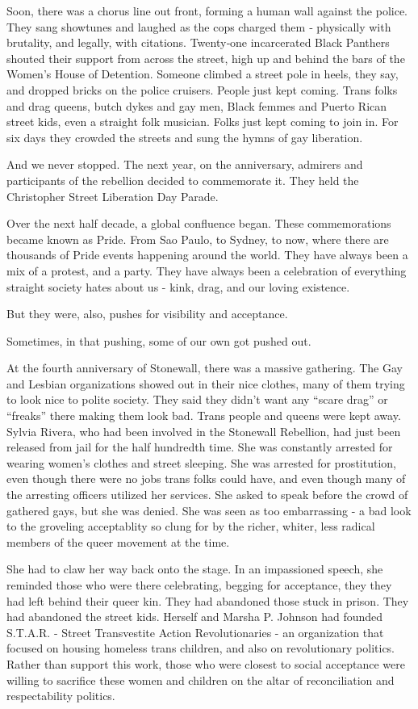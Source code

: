\documentclass[
]{book}
\begin{document}
Soon, there was a chorus line out front, forming a human wall against the police. They sang showtunes and laughed as the cops charged them ‑ physically with brutality, and legally, with citations. Twenty‑one incarcerated Black Panthers shouted their support from across the street, high up and behind the bars of the Women's House of Detention. Someone climbed a street pole in heels, they say, and dropped bricks on the police cruisers. People just kept coming. Trans folks and drag queens, butch dykes and gay men, Black femmes and Puerto Rican street kids, even a straight folk musician. Folks just kept coming to join in. For six days they crowded the streets and sung the hymns of gay liberation.

And we never stopped. The next year, on the anniversary, admirers and participants of the rebellion decided to commemorate it. They held the Christopher Street Liberation Day Parade.

Over the next half decade, a global confluence began. These commemorations became known as Pride. From Sao Paulo, to Sydney, to now, where there are thousands of Pride events happening around the world. They have always been a mix of a protest, and a party. They have always been a celebration of everything straight society hates about us - kink, drag, and our loving existence.

But they were, also, pushes for visibility and acceptance.

Sometimes, in that pushing, some of our own got pushed out.

At the fourth anniversary of Stonewall, there was a massive gathering. The Gay and Lesbian organizations showed out in their nice clothes, many of them trying to look nice to polite society. They said they didn't want any ``scare drag'' or ``freaks'' there making them look bad. Trans people and queens were kept away. Sylvia Rivera, who had been involved in the Stonewall Rebellion, had just been released from jail for the half hundredth time. She was constantly arrested for wearing women's clothes and street sleeping. She was arrested for prostitution, even though there were no jobs trans folks could have, and even though many of the arresting officers utilized her services. She asked to speak before the crowd of gathered gays, but she was denied. She was seen as too embarrassing - a bad look to the groveling acceptablity so clung for by the richer, whiter, less radical members of the queer movement at the time.

She had to claw her way back onto the stage. In an impassioned speech, she reminded those who were there celebrating, begging for acceptance, they they had left behind their queer kin. They had abandoned those stuck in prison. They had abandoned the street kids. Herself and Marsha P. Johnson had founded S.T.A.R. - Street Transvestite Action Revolutionaries - an organization that focused on housing homeless trans children, and also on revolutionary politics. Rather than support this work, those who were closest to social acceptance were willing to sacrifice these women and children on the altar of reconciliation and respectability politics.
\end{document}
